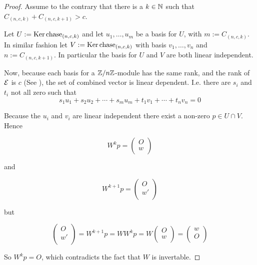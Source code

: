 \begin{proof}
  Assume to the contrary that there is a $k\in\mathbb{N}$ such that $C_{(n, c, k)} + C_{(n, c, k+1)} > c$.

  Let $U := \operatorname{Ker}\operatorname{chase}_{(n, c, k)}$ and let $u_{1}, \ldots, u_{m}$ be a basis for $U$, with $m := C_{(n, c, k)}$.
  In similar fashion let $V := \operatorname{Ker}\operatorname{chase}_{(n, c, k)}$ with basis $v_{1}, \ldots, v_{n}$ and $n := C_{(n, c, k+1)}$. In particular
  the basis for $U$ and $V$ are both linear independent.

  Now, because each basis for a $\mathbb{Z}/n\mathbb{Z}$-module has the same rank, and the rank of $\mathcal{E}$ is $c$ (See \cite{roman07}), the set of combined vector is linear dependent.
  I.e. there are $s_i$ and $t_i$ not all zero such that
  \[
    s_{1} u_{1} + s_{2} u_{2} + \cdots + s_{m} u_{m} + t_{1} v_{1} + \cdots + t_{n} v_{n} = 0 
  \]

  Because the $u_{i}$ and $v_{i}$ are linear independent there exist a non-zero $p \in U \cap V$. Hence

  \[
    W^{k} p =
    \left(
    \begin{array}{c}
      O  \\
      w \\
    \end{array}
    \right)
  \]

  and

  \[
    W^{k+1} p =
    \left(
    \begin{array}{c}
      O  \\
      w' \\
    \end{array}
    \right)
  \]

  but

  \[
    \left(
    \begin{array}{c}
      O  \\
      w' \\
    \end{array}
    \right)
    =
    W^{k+1} p
    =
    W W^{k} p
    =
    W 
    \left(
    \begin{array}{c}
      O \\
      w \\
    \end{array}
    \right)
    =
    \left(
    \begin{array}{c}
      w \\
      O \\
    \end{array}
    \right)
  \]

  So $W^{k} p = O$, which contradicts the fact that $W$ is invertable.
\end{proof}

